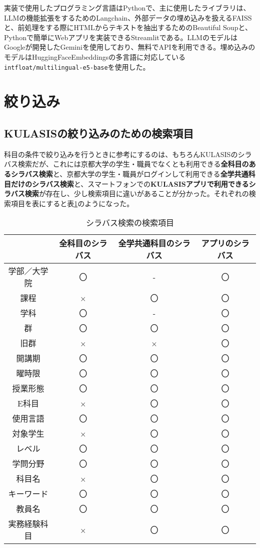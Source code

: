 実装で使用したプログラミング言語はPythonで、主に使用したライブラリは、LLMの機能拡張をするためのLangchain\cite{langchain}、外部データの埋め込みを扱えるFAISS\cite{langchain-faiss}と、前処理をする際にHTMLからテキストを抽出するためのBeautiful Soup\cite{beautifulsoup}と、Pythonで簡単にWebアプリを実装できるStreamlit\cite{streamlit}である。LLMのモデルはGoogleが開発したGemini\cite{gemini}を使用しており、無料でAPIを利用できる。埋め込みのモデルはHuggingFaceEmbeddingsの多言語に対応している\texttt{intfloat/multilingual-e5-base}\cite{intfloat_multilingual_e5_base}を使用した。

\section{絞り込み}
\subsection{KULASISの絞り込みのための検索項目}
科目の条件で絞り込みを行うときに参考にするのは、もちろんKULASISのシラバス検索だが、これには京都大学の学生・職員でなくとも利用できる\textbf{全科目のあるシラバス検索}と、京都大学の学生・職員がログインして利用できる\textbf{全学共通科目だけのシラバス検索}と、スマートフォンでの\textbf{KULASISアプリで利用できるシラバス検索}が存在し、少し検索項目に違いがあることが分かった。それぞれの検索項目を表にすると表\ref{tab:syllabus-search}のようになった。

\begin{table}[h]
\centering
\caption{シラバス検索の検索項目}
\label{tab:syllabus-search}
\begin{tabular}{cccc}\hline
 & 全科目のシラバス & 全学共通科目のシラバス & アプリのシラバス\\ \hline
学部／大学院& 〇 & - & 〇\\
課程& × & 〇 & 〇\\
学科& 〇 & - & 〇\\
群& 〇 & 〇 & 〇\\
旧群& ×& × & 〇\\
開講期& 〇 & 〇 & 〇\\
曜時限& 〇 & 〇 & 〇\\
授業形態& 〇 & 〇 & 〇\\
E科目& × & 〇 & 〇\\
使用言語& 〇 & 〇 & 〇\\
対象学生& × & 〇 & 〇\\
レベル& 〇 & 〇 & 〇\\
学問分野& 〇 & 〇 & 〇\\
科目名& × & 〇 & 〇\\
キーワード& 〇 & 〇 & 〇\\
教員名& 〇 & 〇 & 〇\\
実務経験科目& × & 〇 & 〇\\ \hline
\end{tabular}
\end{table}

